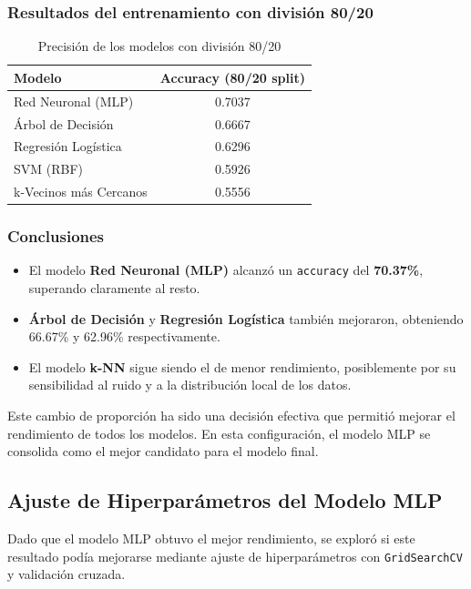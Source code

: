 \documentclass[11pt,a4paper]{article}
\begin{document}
\subsubsection*{Resultados del entrenamiento con división 80/20}

\begin{table}[H]
\centering
\begin{tabular}{lc}
\toprule
\textbf{Modelo} & \textbf{Accuracy (80/20 split)} \\
\midrule
Red Neuronal (MLP) & 0.7037 \\
Árbol de Decisión & 0.6667 \\
Regresión Logística & 0.6296 \\
SVM (RBF) & 0.5926 \\
k-Vecinos más Cercanos & 0.5556 \\
\bottomrule
\end{tabular}
\caption{Precisión de los modelos con división 80/20}
\end{table}

\subsubsection*{Conclusiones}

\begin{itemize}
    \item El modelo \textbf{Red Neuronal (MLP)} alcanzó un \texttt{accuracy} del \textbf{70.37\%}, superando claramente al resto.
    \item \textbf{Árbol de Decisión} y \textbf{Regresión Logística} también mejoraron, obteniendo 66.67\% y 62.96\% respectivamente.
    \item El modelo \textbf{k-NN} sigue siendo el de menor rendimiento, posiblemente por su sensibilidad al ruido y a la distribución local de los datos.
\end{itemize}

\medskip

Este cambio de proporción ha sido una decisión efectiva que permitió mejorar el rendimiento de todos los modelos. En esta configuración, el modelo MLP se consolida como el mejor candidato para el modelo final.

\subsection{Ajuste de Hiperparámetros del Modelo MLP}

Dado que el modelo MLP obtuvo el mejor rendimiento, se exploró si este resultado podía mejorarse mediante ajuste de hiperparámetros con \texttt{GridSearchCV} y validación cruzada.
\end{document}

